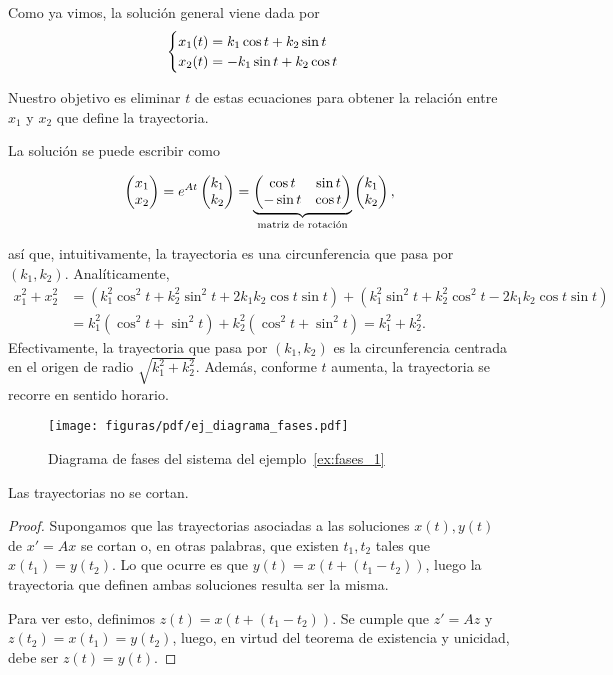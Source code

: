 \documentclass[../ecuaciones_diferenciales.tex]{subfiles}
\begin{document}
\begin{solution}
	Como ya vimos, la solución general viene dada por
	\[\begin{cases}
			x_1(t) = k_1 \cos t + k_2 \sin t \\
			x_2(t) = - k_1 \sin t + k_2 \cos t\end{cases}\]

	Nuestro objetivo es eliminar \(t\) de estas ecuaciones para obtener la
	relación entre \(x_1\) y \(x_2\) que define la trayectoria.

	La solución se puede escribir como

	\[\begin{pmatrix}x_1 \\ x_2\end{pmatrix} = e^{At}\begin{pmatrix}k_1 \\ k_2\end{pmatrix} =
		\underbrace{\begin{pmatrix}\cos t & \sin t \\ -\sin t & \cos t\end{pmatrix}}_{\text{matriz de
				rotación}} \begin{pmatrix}k_1 \\ k_2\end{pmatrix},\]

	así que, intuitivamente, la trayectoria es una circunferencia que pasa por
	\((k_1, k_2)\). Analíticamente,
	\begin{align*}
		x_1^2 + x_2^2 & = (k_1^2\cos^2t + k_2^2\sin^2t + 2k_1k_2\cos t \sin t)
		+ (k_1^2\sin^2t + k_2^2\cos^2t - 2k_1k_2\cos t \sin t)                                 \\
		              & = k_1^2(\cos^2 t + \sin^2 t) + k_2^2(\cos^2t + \sin^2t) = k_1^2+k_2^2.
	\end{align*}
	Efectivamente, la trayectoria que pasa por \((k_1, k_2)\) es la
	circunferencia centrada en el origen de radio \(\sqrt{k_1^2+k_2^2}\). Además,
	conforme \(t\) aumenta, la trayectoria se recorre en sentido horario.
\end{solution}

\begin{figure}[ht]
	\centering
	\texttt{[image: figuras/pdf/ej\_diagrama\_fases.pdf]}
	\caption{Diagrama de fases del sistema del ejemplo~\ref{ex:fases_1}}
\end{figure}


\begin{theorem}
	Las trayectorias no se cortan.
	\begin{proof}
		Supongamos que las trayectorias asociadas a las soluciones \(x(t), y(t)\) de
		\(x' = Ax\) se cortan o, en otras palabras, que existen \(t_1, t_2\) tales
		que \(x(t_1) = y(t_2)\). Lo que ocurre es que \(y(t) = x(t + (t_1-t_2))\),
		luego la trayectoria que definen ambas soluciones resulta ser la misma.

		Para ver esto, definimos \(z(t) = x(t + (t_1-t_2))\). Se cumple que \(z' =
		Az\) y \(z(t_2) = x(t_1) = y(t_2)\), luego, en virtud del teorema de
		existencia y unicidad, debe ser \(z(t) = y(t)\).
	\end{proof}
\end{theorem}
\end{document}
